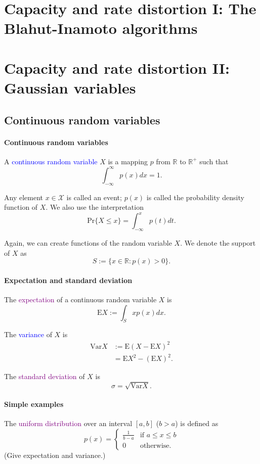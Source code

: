 \documentclass[a4paper, 11pt, openany]{book}
\numberwithin{equation}{section}
\theoremstyle{plain}
\theoremstyle{definition}
\newcommand{\Structure}[1]{\textcolor{blue}{#1}}
\newcommand{\Define}[1]{\textcolor{purple}{#1}}
\newcommand{\alphabet}[1]{\mathcal{#1}}
\begin{document}
\section{Capacity and rate distortion I: The Blahut-Inamoto algorithms}
\label{sec:37}


\section{Capacity and rate distortion II: Gaussian variables}
\label{sec:38}



\subsection{Continuous random variables}


\paragraph{Continuous random variables}
A \Structure{continuous random variable} $X$ is a mapping $p$ from $\mathbb{R}$ to $\mathbb{R}^+$ such that
\[
	 \int_{-\infty}^\infty p(x) dx = 1.
\]


Any element $x \in \alphabet{X}$ is called an event; $p(x)$ is called the probability density function of $X$. We also use the interpretation
\[
	\mathrm{Pr} \{ X \le x\} = \int_{-\infty}^x p(t) dt.
\]

Again, we can create functions of the random variable $X$. We denote the support of $X$ as
\[
	S := \{x \in \mathbb{R} : p(x) > 0\}.
\]


\paragraph{Expectation and standard deviation}
The \Define{expectation} of a continuous random variable $X$ is
\[
	\mathrm{E} X := \int_S x p(x) dx.
\]

The \Structure{variance} of $X$ is
\begin{align*}
	\mathrm{Var} X 	&:= \mathrm{E} (X - \mathrm{E}X)^2\\
					&= \mathrm{E} X^2 - (\mathrm{E} X)^2.
\end{align*}

The \Define{standard deviation} of $X$ is
\[
	\sigma =\sqrt{\mathrm{Var} X}.
\]


\paragraph{Simple examples}
The \Define{uniform distribution} over an interval $[a,b]$ ($b > a$) is defined as
\[
	p(x) = \begin{cases}
		\frac{1}{b-a} &\text{if } a \le x \le b\\
		0 &\text{otherwise}.
	\end{cases}
\]
(Give expectation and variance.)
\end{document}
